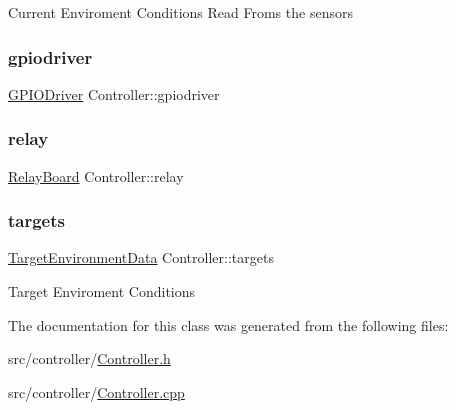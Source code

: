 Current Enviroment Conditions Read Froms the sensors \mbox{\label{classController_aa3d6dde5a09dfc1a34bfaee1e7fa3434}} 
\subsubsection{\texorpdfstring{gpiodriver}{gpiodriver}}
{\footnotesize\ttfamily \hyperlink{classGPIODriver}{G\+P\+I\+O\+Driver} Controller\+::gpiodriver\hspace{0.3cm}{\ttfamily [private]}}

\mbox{\label{classController_aa3f1d7aae706a5440adf520cbd7fb216}} 
\subsubsection{\texorpdfstring{relay}{relay}}
{\footnotesize\ttfamily \hyperlink{classRelayBoard}{Relay\+Board} Controller\+::relay\hspace{0.3cm}{\ttfamily [private]}}

\mbox{\label{classController_a8f2fb8295fd3da6ebc8bdb0f25036322}} 
\subsubsection{\texorpdfstring{targets}{targets}}
{\footnotesize\ttfamily \hyperlink{structTargetEnvironmentData}{Target\+Environment\+Data} Controller\+::targets}

Target Enviroment Conditions 

The documentation for this class was generated from the following files\+:\begin{DoxyCompactItemize}
\item 
src/controller/\hyperlink{Controller_8h}{Controller.\+h}\item 
src/controller/\hyperlink{Controller_8cpp}{Controller.\+cpp}\end{DoxyCompactItemize}
